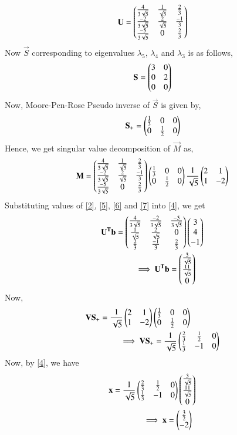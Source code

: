 \documentclass[journal,12pt,twocolumn]{IEEEtran}
\begin{document}
\begin{align}
	\mathbf{U} = \begin{pmatrix}\frac{4}{3\sqrt{5}} & \frac{1}{\sqrt{5}} & \frac{2}{3} \\ \frac{-2}{3\sqrt{5}}  & \frac{2}{\sqrt{5}} & \frac{-1}{3} \\ \frac{-5}{3\sqrt{5}}  & 0 & \frac{2}{3} \end{pmatrix} \label{6}
\end{align}
Now $\vec{S}$ corresponding to eigenvalues $\lambda_5$, $\lambda_4$ and $\lambda_3$ is as follows,
\begin{align}
\mathbf{S} = \begin{pmatrix}3 & 0 \\ 0 & 2 \\ 0 & 0\end{pmatrix}\label{7}
\end{align}
Now, Moore-Pen-Rose Pseudo inverse of $\vec{S}$ is given by,
\begin{align}
\mathbf{S_+} = \begin{pmatrix}\frac{1}{3} & 0 & 0 \\ 0 & \frac{1}{2} & 0\end{pmatrix}
\end{align}
Hence, we get singular value decomposition of $\vec{M}$ as,
\begin{align}
\mathbf{M} = \begin{pmatrix}\frac{4}{3\sqrt{5}} & \frac{1}{\sqrt{5}} & \frac{2}{3} \\ \frac{-2}{3\sqrt{5}}  & \frac{2}{\sqrt{5}} & \frac{-1}{3} \\ \frac{-5}{3\sqrt{5}}  & 0 & \frac{2}{3} \end{pmatrix} \begin{pmatrix}\frac{1}{3} & 0 & 0 \\ 0 & \frac{1}{2} & 0\end{pmatrix} \frac{1}{\sqrt{5}}\begin{pmatrix}2 & 1 \\ 1 & -2 \end{pmatrix}
\end{align}
Substituting values of \eqref{2}, \eqref{5}, \eqref{6} and \eqref{7} into \eqref{4}, we get
\begin{align}
& \mathbf{U^Tb} =  \begin{pmatrix}\frac{4}{3\sqrt{5}} & \frac{-2}{3\sqrt{5}} & \frac{-5}{3\sqrt{5}} \\ \frac{1}{\sqrt{5}}   & \frac{2}{\sqrt{5}} & 0 \\ \frac{2}{3} & \frac{-1}{3} & \frac{2}{3}\end{pmatrix}
\begin{pmatrix}3 \\4\\-1\end{pmatrix} \\
& \qquad \qquad\implies \mathbf{U^Tb} = \begin{pmatrix}\frac{3}{\sqrt{5}} \\ \frac{11}{\sqrt{5}} \\ 0\end{pmatrix} 
\end{align}
Now,
\begin{align}
& \mathbf{VS_+} = \frac{1}{\sqrt{5}}\begin{pmatrix}2 & 1 \\ 1 & -2 \end{pmatrix}\begin{pmatrix}\frac{1}{3} & 0 & 0 \\ 0 & \frac{1}{2} & 0\end{pmatrix} \\
& \qquad \qquad \implies \mathbf{VS_+} = \frac{1}{\sqrt{5}}\begin{pmatrix}\frac{2}{3} & \frac{1}{2} &0 \\ \frac{1}{3} & -1 & 0 \end{pmatrix}
\end{align}
Now, by \eqref{4}, we have
\begin{align}
& \mathbf{x} = \frac{1}{\sqrt{5}}\begin{pmatrix}\frac{2}{3} & \frac{1}{2} &0 \\ \frac{1}{3} & -1 & 0 \end{pmatrix} 
\begin{pmatrix}\frac{3}{\sqrt{5}} \\ \frac{11}{\sqrt{5}} \\ 0\end{pmatrix}  \\
& \qquad \qquad \implies \mathbf{x} = \begin{pmatrix}\frac{3}{2} \\ -2\end{pmatrix}
\end{align}
\end{document}

